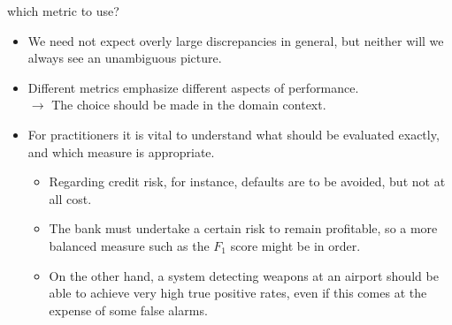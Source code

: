 \documentclass[11pt,compress,t,notes=noshow, xcolor=table]{beamer}
\begin{document}
\begin{vbframe}{which metric to use?}
\begin{itemize}
  \item We need not expect overly large discrepancies in general, but neither 
  will we always see an unambiguous picture. 
  \item Different metrics emphasize different aspects of performance. \\
  $\rightarrow$ The choice should be made in the domain context.
  \item For practitioners it is vital to understand what should be 
  evaluated exactly, and which measure is appropriate.  
  \begin{itemize}
    \item Regarding credit risk, for instance, defaults are to be avoided, but 
    not at all cost.
    \item The bank must undertake a certain risk to remain profitable, so a more 
    balanced measure such as the $F_1$ score might be in order.
    \item On the other hand, a system detecting weapons at an airport should be 
    able to achieve very high true positive rates, even if this comes at the 
    expense of some false alarms.
  \end{itemize}
\end{itemize}

\end{vbframe}


\endlecture
\end{document}
